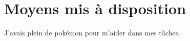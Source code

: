 \documentclass[../main.tex]{subfiles}
\begin{document}
\section{Moyens mis à disposition}

J'avais plein de pokémon pour m'aider dans mes tâches.
\end{document}
